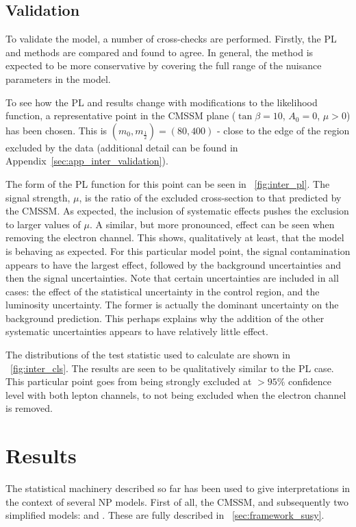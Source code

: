\subsection{Validation}
\label{sec:inter_validation}
To validate the model, a number of cross-checks are performed. Firstly, the
\ac{PL} and \CLs methods are compared and found to agree. In general, the \CLs
method is expected to be more conservative by covering the full range of the
nuisance parameters in the model.

To see how the \ac{PL} and \CLs results change with modifications to the
likelihood function, a representative point in the \ac{CMSSM} plane
($\tan\beta=10$, $A_0=0$, $\mu>0$) has been chosen. This is $(m_0,
m_{\frac{1}{2}}) = (80, 400)$ - close to the edge of the region excluded by the
data (additional detail can be found in
Appendix~\ref{sec:app_inter_validation}).

The form of the \ac{PL} function for this point can be seen in
\fig~\ref{fig:inter_pl}. The signal strength, $\mu$, is the ratio of the
excluded cross-section to that predicted by the \ac{CMSSM}. As expected, the
inclusion of systematic effects pushes the exclusion to larger values of
$\mu$. A similar, but more pronounced, effect can be seen when removing the
electron channel. This shows, qualitatively at least, that the model is behaving
as expected. For this particular model point, the signal contamination appears
to have the largest effect, followed by the background uncertainties and then
the signal uncertainties. Note that certain uncertainties are included in all
cases: the effect of the statistical uncertainty in the control region, and the
luminosity uncertainty. The former is actually the dominant uncertainty on the
background prediction. This perhaps explains why the addition of the other
systematic uncertainties appears to have relatively little effect.

The distributions of the test statistic used to calculate \CLs are shown in
\fig~\ref{fig:inter_cls}. The results are seen to be qualitatively similar to
the \ac{PL} case. This particular point goes from being strongly excluded at $>
95\%$ confidence level with both lepton channels, to not being excluded when the
electron channel is removed.

\section{Results}
The statistical machinery described so far has been used to give interpretations
in the context of several \ac{NP} models. First of all, the \ac{CMSSM}, and
subsequently two simplified models: \Ttwott and \TthreeW. These are fully
described in \sec~\ref{sec:framework_susy}.

